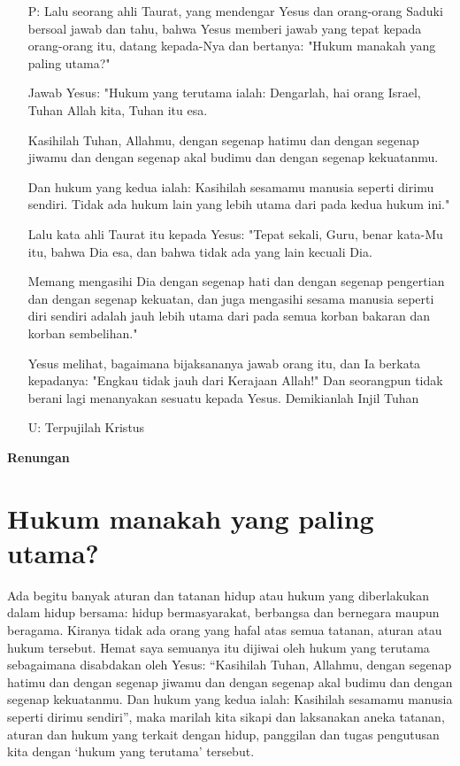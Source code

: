 \documentclass[a4paper,12pt]{scrartcl}
\makeatletter
\newcommand{\subjudul}[1]{%
  {\parindent \z@ 
    \interlinepenalty\@M \bfseries #1\par\nobreak \vskip 10\p@ }}
\newcommand{\BU}[1]{\begin{itemize} \item[U:] #1 \end{itemize}}
\newcommand{\BP}[1]{\begin{itemize} \item[P:] #1 \end{itemize}}
\makeatother
\begin{document}
\BP{
Lalu seorang ahli Taurat, yang mendengar Yesus dan orang-orang Saduki bersoal jawab dan tahu, bahwa Yesus memberi jawab yang tepat kepada orang-orang itu, datang kepada-Nya dan bertanya: "Hukum manakah yang paling utama?"

Jawab Yesus: "Hukum yang terutama ialah: Dengarlah, hai orang Israel, Tuhan Allah kita, Tuhan itu esa.

Kasihilah Tuhan, Allahmu, dengan segenap hatimu dan dengan segenap jiwamu dan dengan segenap akal budimu dan dengan segenap kekuatanmu.

Dan hukum yang kedua ialah: Kasihilah sesamamu manusia seperti dirimu sendiri. Tidak ada hukum lain yang lebih utama dari pada kedua hukum ini."

Lalu kata ahli Taurat itu kepada Yesus: "Tepat sekali, Guru, benar kata-Mu itu, bahwa Dia esa, dan bahwa tidak ada yang lain kecuali Dia.

Memang mengasihi Dia dengan segenap hati dan dengan segenap pengertian dan dengan segenap kekuatan, dan juga mengasihi sesama manusia seperti diri sendiri adalah jauh lebih utama dari pada semua korban bakaran dan korban sembelihan."

Yesus melihat, bagaimana bijaksananya jawab orang itu, dan Ia berkata kepadanya: "Engkau tidak jauh dari Kerajaan Allah!" Dan seorangpun tidak berani lagi menanyakan sesuatu kepada Yesus.
Demikianlah Injil Tuhan}

\BU{Terpujilah Kristus}

\subjudul{Renungan}
\section*{Hukum manakah yang paling utama?}
Ada begitu banyak aturan dan tatanan hidup atau hukum yang diberlakukan dalam hidup bersama: hidup bermasyarakat, berbangsa dan bernegara maupun beragama. Kiranya tidak ada orang yang hafal atas semua tatanan, aturan atau hukum tersebut.  Hemat saya semuanya itu dijiwai oleh hukum yang terutama sebagaimana disabdakan oleh Yesus: “Kasihilah Tuhan, Allahmu, dengan segenap hatimu dan dengan segenap jiwamu dan dengan segenap akal budimu dan dengan segenap kekuatanmu. Dan hukum yang kedua ialah: Kasihilah sesamamu manusia seperti dirimu sendiri”, maka marilah kita sikapi dan laksanakan aneka tatanan, aturan dan hukum yang terkait dengan hidup, panggilan dan tugas pengutusan kita dengan ‘hukum yang terutama’ tersebut. 
\end{document}
